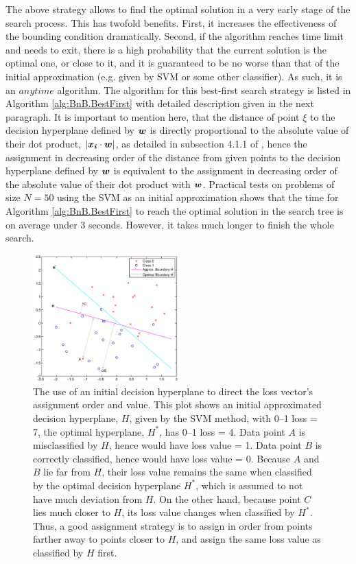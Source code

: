 The above strategy allows to find the optimal solution in a very early
stage of the search process. This has twofold benefits. First, it
increases the effectiveness of the bounding condition
dramatically. Second, if the algorithm reaches time limit and needs to
exit, there is a high probability that the current solution is the
optimal one, or close to it, and it is guaranteed to be no worse than
that of the initial approximation (e.g. given by SVM or some other
classifier). As such, it is an $anytime$ algorithm. The algorithm for
this best-first search strategy is listed in Algorithm
\ref{alg:BnB.BestFirst} with detailed description given in the next
paragraph. It is important to mention here, that the distance of point
$\xi$ to the decision hyperplane defined by $\boldsymbol{w}$ is directly
proportional to the absolute value of their dot product, $| \boldsymbol{x_i} \cdot
\boldsymbol{w} |$, as detailed in subsection 4.1.1 of \cite{bishop06}, hence the
assignment in decreasing order of the distance from given points to
the decision hyperplane defined by $\boldsymbol{w}$ is equivalent to the
assignment in decreasing order of the absolute value of their dot
product with $\boldsymbol{w}$. Practical tests on problems of size $N=50$ using
the SVM as an initial approximation shows that the time for Algorithm
\ref{alg:BnB.BestFirst} to reach the optimal solution in the search
tree is on average under 3 seconds. However, it takes much longer to
finish the whole search.

\begin{figure}[here]
\includegraphics[width=0.50\textwidth]{images/fig31_svmhyperplane.eps}
\caption{ The use of an initial decision hyperplane to direct the loss
  vector's assignment order and value.  This plot shows an initial
  approximated decision hyperplane, $H$, given by the SVM method, with
  0--1 loss = 7, the optimal hyperplane, $H^*$, has 0--1 loss =
  4. Data point $A$ is misclassified by $H$, hence would have loss
  value = 1. Data point $B$ is correctly classified, hence would have
  loss value = 0. Because $A$ and $B$ lie far from $H$, their loss
  value remains the same when classified by the optimal decision
  hyperplane $H^*$, which is assumed to not have much deviation from
  $H$. On the other hand, because point $C$ lies much closer to $H$,
  its loss value changes when classified by $H^*$. Thus, a good
  assignment strategy is to assign in order from points farther away
  to points closer to $H$, and assign the same loss value as
  classified by $H$ first.  }
\label{fig:svm_hyperplane}
\end{figure}


